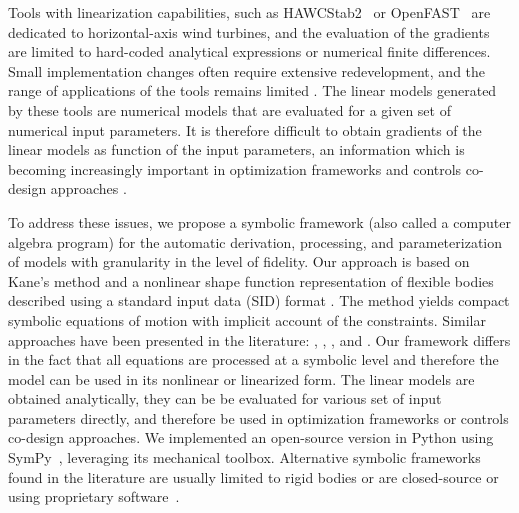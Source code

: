 \documentclass[wes, manuscript]{copernicus}
\begin{document}
Tools with linearization capabilities, such as HAWCStab2~\citep{Sonderby:2014} or OpenFAST~\citep{OpenFAST} are dedicated to horizontal-axis wind turbines, and the evaluation of the gradients are limited to hard-coded analytical expressions or numerical finite differences. 
Small implementation changes often require extensive redevelopment, and the range of applications of the tools remains limited \citep{Simani:2015}.
The linear models generated by these tools are numerical models that are evaluated for a given set of numerical input parameters. It is therefore difficult to obtain gradients of the linear models as function of the input parameters, an information which is becoming increasingly important in optimization frameworks and controls co-design approaches \citep{Jonkman:2022lin}.






To address these issues, we propose a symbolic framework (also called a computer algebra program) for the automatic derivation, processing, and
parameterization of models with granularity in the level of fidelity.
Our approach is based on Kane’s method \citep{kane:1965} and a nonlinear shape function representation of flexible bodies \citep{shabana:book}
 described using a standard input data (SID) format \citep{Wallrapp:1994, Schwertassek:book}.
The method yields compact symbolic equations of motion with implicit account of the constraints. 
Similar approaches have been presented in the literature: \cite{Kurtz:2009}, \cite{Merz:2018}, \cite{Lemmer:2018}, and \cite{branlard:2019flex}.
Our framework differs in the fact that all equations are processed at a symbolic level and therefore the model can be used in its nonlinear or linearized form. 
The linear models are obtained analytically, they can be be evaluated for various set of input parameters directly, and therefore be used in optimization frameworks or controls co-design approaches.
We implemented an open-source version in Python using SymPy~\citep{sympy},  leveraging its mechanical toolbox.
Alternative symbolic frameworks found in the literature are usually limited to rigid bodies \citep{Verlinden:2005,Kurtz:2009,Gede:2013,Docquier:2013} or are closed-source or using proprietary software~\citep{Autolev,NeweulM2,MotionGenesis,Lemmer:2018}.
\end{document}
